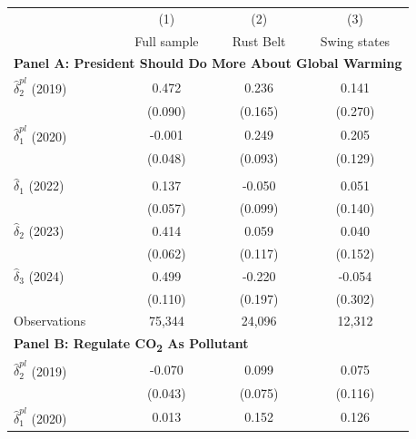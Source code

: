 \begin{tabular}{l*{3}{c}} \toprule
            &\multicolumn{1}{c}{(1)}&\multicolumn{1}{c}{(2)}&\multicolumn{1}{c}{(3)}\\
            &\multicolumn{1}{c}{Full sample}&\multicolumn{1}{c}{Rust Belt}&\multicolumn{1}{c}{Swing states}\\
\midrule \multicolumn{4}{l}{\textbf{Panel A: President Should Do More About Global Warming}} \\
$\hat{\delta}_2^{pl}$ (2019)&       0.472\sym{***}&       0.236         &       0.141         \\
            &     (0.090)         &     (0.165)         &     (0.270)         \\
\addlinespace
$\hat{\delta}_1^{pl}$ (2020)&      -0.001         &       0.249\sym{***}&       0.205         \\
            &     (0.048)         &     (0.093)         &     (0.129)         \\
\addlinespace
\addlinespace&                     &                     &                     \\
\addlinespace
$\hat{\delta}_1$ (2022)&       0.137\sym{**} &      -0.050         &       0.051         \\
            &     (0.057)         &     (0.099)         &     (0.140)         \\
\addlinespace
$\hat{\delta}_2$ (2023)&       0.414\sym{***}&       0.059         &       0.040         \\
            &     (0.062)         &     (0.117)         &     (0.152)         \\
\addlinespace
$\hat{\delta}_3$ (2024)&       0.499\sym{***}&      -0.220         &      -0.054         \\
            &     (0.110)         &     (0.197)         &     (0.302)         \\
\midrule
Observations&      75,344         &      24,096         &      12,312         \\
\midrule
\multicolumn{4}{l}{\textbf{Panel B: Regulate CO\textsubscript{2} As Pollutant}} \\
$\hat{\delta}_2^{pl}$ (2019)&      -0.070         &       0.099         &       0.075         \\
            &     (0.043)         &     (0.075)         &     (0.116)         \\
\addlinespace
$\hat{\delta}_1^{pl}$ (2020)&       0.013         &       0.152\sym{**} &       0.126         \\

\end{tabular}
